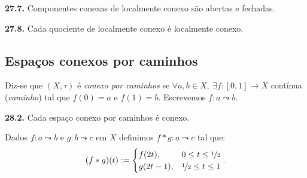 
\begin{corollary}
    \textbf{27.7.} Componentes conexas de localmente conexo são abertas e fechadas. 
\end{corollary}

\begin{proposition}
    \textbf{27.8.} Cada quociente de localmente conexo é localmente conexo. 
\end{proposition}


\subsection*{Espaços conexos por caminhos}

\begin{definition}
    Diz-se que \((X,\tau)\) é \emph{conexo por caminhos} se \(\forall a, b \in X, \ \exists f: [0,1] \to X\) contínua (\emph{caminho})  tal que \(f(0) = a\) e \(f(1) = b \). Escrevemos \(f: a \leadsto b\).  
\end{definition}

\begin{proposition}
    \textbf{28.2.} Cada espaço conexo por caminhos é conexo. 
\end{proposition}


\begin{definition}
    Dados \(f: a \leadsto b \) e \(g : b \leadsto c\) em \(X\) definimos \(f *g : a \leadsto c\) tal que:
    \[(f*g) (t) := \begin{cases}
        f(2t), &0\leq t \leq \nicefrac{1}{2} \\ 
        g(2t-1), & \nicefrac{1}{2} \leq t \leq 1
    \end{cases}.\] 
\end{definition}


